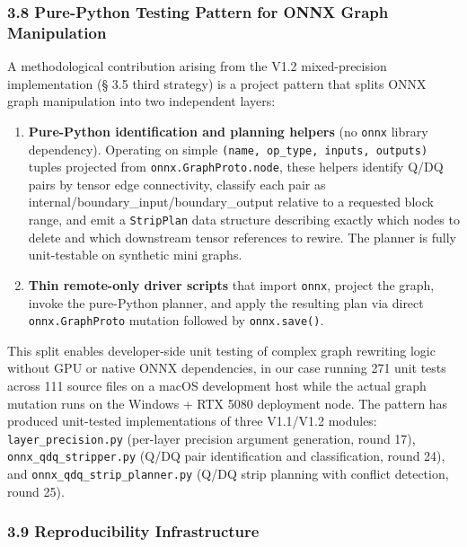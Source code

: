 \documentclass[
]{article}
\begin{document}
\subsubsection{3.8 Pure-Python Testing Pattern for ONNX Graph
Manipulation}\label{pure-python-testing-pattern-for-onnx-graph-manipulation}

A methodological contribution arising from the V1.2 mixed-precision
implementation (§ 3.5 third strategy) is a project pattern that splits
ONNX graph manipulation into two independent layers:

\begin{enumerate}
\def\labelenumi{\arabic{enumi}.}
\item
  \textbf{Pure-Python identification and planning helpers} (no
  \texttt{onnx} library dependency). Operating on simple
  \texttt{(name,\ op\_type,\ inputs,\ outputs)} tuples projected from
  \texttt{onnx.GraphProto.node}, these helpers identify Q/DQ pairs by
  tensor edge connectivity, classify each pair as
  internal/boundary\_input/boundary\_output relative to a requested
  block range, and emit a \texttt{StripPlan} data structure describing
  exactly which nodes to delete and which downstream tensor references
  to rewire. The planner is fully unit-testable on synthetic mini
  graphs.
\item
  \textbf{Thin remote-only driver scripts} that import \texttt{onnx},
  project the graph, invoke the pure-Python planner, and apply the
  resulting plan via direct \texttt{onnx.GraphProto} mutation followed
  by \texttt{onnx.save()}.
\end{enumerate}

This split enables developer-side unit testing of complex graph
rewriting logic without GPU or native ONNX dependencies, in our case
running 271 unit tests across 111 source files on a macOS development
host while the actual graph mutation runs on the Windows + RTX 5080
deployment node. The pattern has produced unit-tested implementations of
three V1.1/V1.2 modules: \texttt{layer\_precision.py} (per-layer
precision argument generation, round 17),
\texttt{onnx\_qdq\_stripper.py} (Q/DQ pair identification and
classification, round 24), and \texttt{onnx\_qdq\_strip\_planner.py}
(Q/DQ strip planning with conflict detection, round 25).

\subsubsection{3.9 Reproducibility
Infrastructure}\label{reproducibility-infrastructure}
\end{document}
